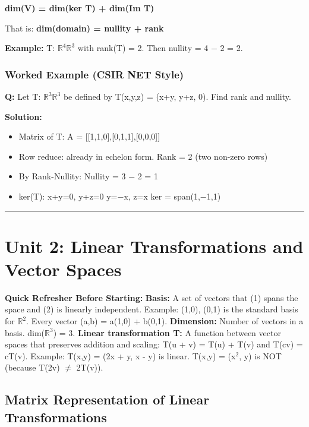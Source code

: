 \documentclass[12pt,a4paper,openany]{book}
\begin{document}
{{\textbf{dim(V) = dim(ker T) + dim(Im T)}

That is: \textbf{dim(domain) = nullity + rank}

\begin{tcolorbox}[colback=examplebg!30,colframe=exampleborder,title=\textbf{Worked Example},breakable,boxrule=1pt]
\textbf{Example:} T: $\mathbb{R}^4\mathbb{R}^3$ with rank(T) = 2. Then nullity = 4 − 2 = 2.
\end{tcolorbox}

\subsubsection{Worked Example (CSIR NET Style)}
\textbf{Q:} Let T: $\mathbb{R}^3\mathbb{R}^3$ be defined by T(x,y,z) = (x+y, y+z, 0). Find rank and nullity.

\textbf{Solution:}
\begin{itemize}[leftmargin=*]
  \item Matrix of T: A = [[1,1,0],[0,1,1],[0,0,0]]
  \item Row reduce: already in echelon form. Rank = 2 (two non-zero rows)
  \item By Rank-Nullity: Nullity = 3 − 2 = 1
  \item ker(T): x+y=0, y+z=0  y=−x, z=x  ker = span{(1,−1,1)}
\end{itemize}

\bigskip\noindent\rule{\textwidth}{0.4pt}\bigskip

\section{Unit 2: Linear Transformations and Vector Spaces}

\begin{prereqbox}
 \textbf{Quick Refresher Before Starting:}
\textbf{Basis:} A set of vectors that (1) spans the space and (2) is linearly independent.
Example: {(1,0), (0,1)} is the standard basis for $\mathbb{R}^2$. Every vector (a,b) = a(1,0) + b(0,1).
\textbf{Dimension:} Number of vectors in a basis. dim($\mathbb{R}^3$) = 3.
\textbf{Linear transformation T:} A function between vector spaces that preserves addition and scaling:
T(u + v) = T(u) + T(v) and T(cv) = cT(v).
Example: T(x,y) = (2x + y, x - y) is linear. T(x,y) = (x$^2$, y) is NOT (because T(2v) $\neq$ 2T(v)).
\end{prereqbox}


\subsection{Matrix Representation of Linear Transformations}

}}
\end{document}
